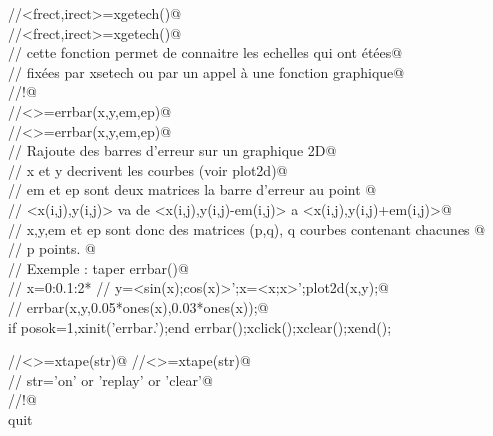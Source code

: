 \verb@//<frect,irect>=xgetech()@ \\
\verb@//<frect,irect>=xgetech()@ \\
\verb@// cette fonction permet de connaitre les echelles qui ont \'et\'ees@ \\
\verb@// fix\'ees par xsetech ou par un appel \`a une fonction graphique@ \\
\verb@//!@ \\


\verb@//<>=errbar(x,y,em,ep)@ \\
\verb@//<>=errbar(x,y,em,ep)@ \\
\verb@// Rajoute des barres d'erreur sur un graphique 2D@ \\
\verb@// x et y decrivent les courbes (voir plot2d)@ \\
\verb@// em et ep sont deux matrices la barre d'erreur au point @ \\
\verb@// <x(i,j),y(i,j)> va de <x(i,j),y(i,j)-em(i,j)> a <x(i,j),y(i,j)+em(i,j)>@ \\
\verb@// x,y,em et ep sont donc des matrices (p,q), q courbes contenant chacunes @ \\
\verb@// p points. @ \\
\verb@// Exemple : taper errbar()@ \\
\verb@//      x=0:0.1:2*%pi;@ \\
\verb@//   y=<sin(x);cos(x)>';x=<x;x>';plot2d(x,y);@ \\
\verb@//   errbar(x,y,0.05*ones(x),0.03*ones(x));@ \\
if posok=1,xinit('errbar.');end
errbar();xclick();xclear();xend();


\verb@//<>=xtape(str)@ 
\verb@//<>=xtape(str)@ \\
\verb@// str='on' or 'replay' or 'clear'@ \\
\verb@//!@ \\


quit

